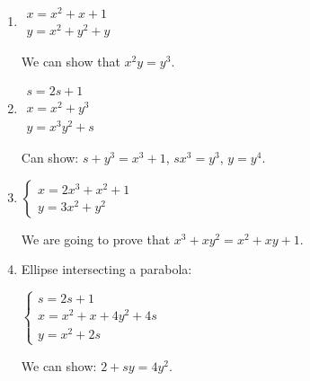 \documentclass[numbers=enddot]{scrartcl}
\begin{document}
\begin{enumerate}
  \item 

  $\begin{array}{l}
      x = x^2 + x + 1\\
      y = x^2 + y^2 + y
    \end{array}$
    
    We can show that $x^2y = y^3$.

  \item 

  $\begin{array}{l}
      s = 2s+1\\
      x = x^2+y^3\\
      y = x^3y^2 + s
    \end{array}$

    Can show: $s+y^3 = x^3 + 1$,
    $sx^3 = y^3$, $y = y^4$.

\item $\begin{cases}
    x = 2x^3 + x^2 + 1 \\
    y = 3x^2 + y^2 
  \end{cases}$

  We are going to prove that $x^3 + xy^2 = x^2 + xy + 1$.

  \item Ellipse intersecting a parabola: 

    $\begin{cases}
    s = 2s+1\\
    x = x^2+x+4y^2+4s\\
    y = x^2 + 2s 
  \end{cases}$

  We can show: $2+sy = 4y^2$.

\end{enumerate}
\end{document}
